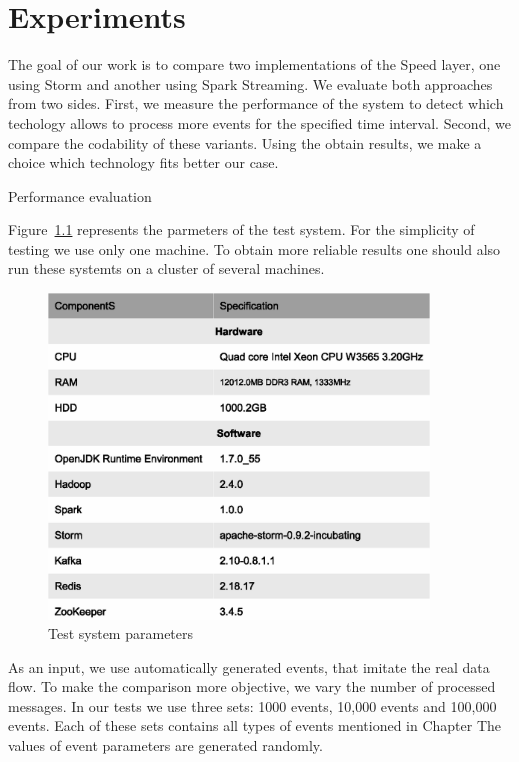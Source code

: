 \chapter{Experiments}
\label{chap:experiments}

The goal of our work is to compare two implementations of the Speed layer, one using Storm and another using Spark Streaming.
We evaluate both approaches from two sides.
First, we measure the performance of the system to detect which techology allows to process more events for the specified time interval.
Second, we compare the codability of these variants.
Using the obtain results, we make a choice which technology fits better our case.

Performance evaluation

Figure~\ref{fig:test_system_parameters} represents the parmeters of the test system.
For the simplicity of testing we use only one machine.
To obtain more reliable results one should also run these systemts on a cluster of several machines.

\begin{figure}
  \centering
  \includegraphics [width=0.9\textwidth]{images/test_system_parameters}
  \caption{Test system parameters}
  \label{fig:test_system_parameters}
\end{figure}

As an input, we use automatically generated events, that imitate the real data flow.
To make the comparison more objective, we vary the number of processed messages.
In our tests we use three sets: 1000 events, 10,000 events and 100,000 events.
Each of these sets contains all types of events mentioned in Chapter %
The values of event parameters are generated randomly.

